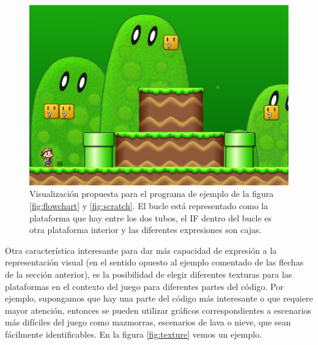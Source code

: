 \documentclass{llncs}
\begin{document}
\begin{figure}[ht]
\begin{center}
\includegraphics[scale=0.15]{images/flowchartgame.eps}
\caption{Visualización propuesta para el programa de ejemplo de la figura \ref{fig:flowchart} y \ref{fig:scratch}. El bucle está representado como la plataforma que hay entre los dos tubos, el IF dentro del bucle es otra plataforma interior y las diferentes expresiones son cajas.
\label{fig:flowchartgame}}
\end{center}
\end{figure}

Otra característica interesante para dar más capacidad de expresión a la representación visual (en el sentido opuesto al ejemplo comentado de las flechas de la sección anterior), es la posibilidad de elegir diferentes texturas para las plataformas en el contexto del juego para diferentes partes del código. Por ejemplo, supongamos que hay una parte del código más interesante o que requiere mayor atención, entonces se pueden utilizar gráficos correspondientes a escenarios más difíciles del juego como mazmorras, escenarios de lava o nieve, que sean fácilmente identificables. En la figura \ref{fig:texture} vemos un ejemplo.
\end{document}
